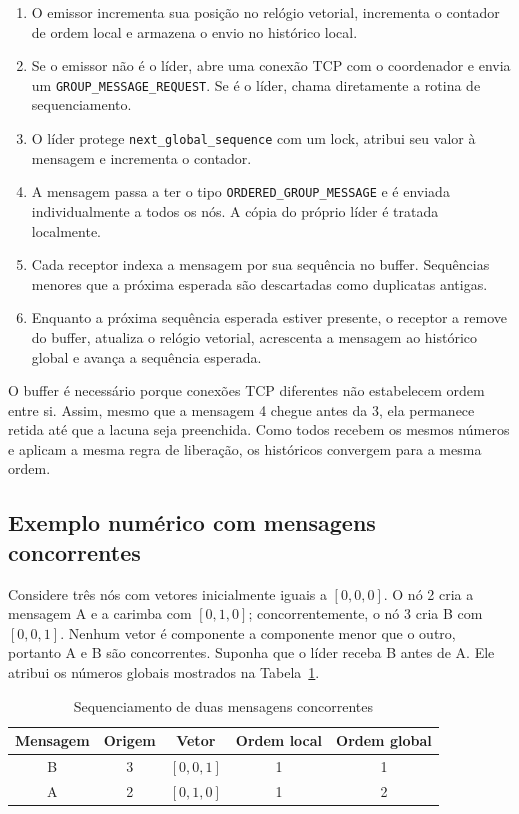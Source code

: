 \begin{enumerate}
    \item O emissor incrementa sua posição no relógio vetorial, incrementa o
    contador de ordem local e armazena o envio no histórico local.
    \item Se o emissor não é o líder, abre uma conexão TCP com o coordenador e
    envia um \texttt{GROUP\_MESSAGE\_REQUEST}. Se é o líder, chama diretamente a
    rotina de sequenciamento.
    \item O líder protege \texttt{next\_global\_sequence} com um lock, atribui seu
    valor à mensagem e incrementa o contador.
    \item A mensagem passa a ter o tipo \texttt{ORDERED\_GROUP\_MESSAGE} e é
    enviada individualmente a todos os nós. A cópia do próprio líder é tratada
    localmente.
    \item Cada receptor indexa a mensagem por sua sequência no buffer. Sequências
    menores que a próxima esperada são descartadas como duplicatas antigas.
    \item Enquanto a próxima sequência esperada estiver presente, o receptor a
    remove do buffer, atualiza o relógio vetorial, acrescenta a mensagem ao
    histórico global e avança a sequência esperada.
\end{enumerate}

O buffer é necessário porque conexões TCP diferentes não estabelecem ordem entre
si. Assim, mesmo que a mensagem 4 chegue antes da 3, ela permanece retida até que
a lacuna seja preenchida. Como todos recebem os mesmos números e aplicam a mesma
regra de liberação, os históricos convergem para a mesma ordem.

\subsection{Exemplo numérico com mensagens concorrentes}

Considere três nós com vetores inicialmente iguais a $[0,0,0]$. O nó 2 cria a
mensagem A e a carimba com $[0,1,0]$; concorrentemente, o nó 3 cria B com
$[0,0,1]$. Nenhum vetor é componente a componente menor que o outro, portanto A e
B são concorrentes. Suponha que o líder receba B antes de A. Ele atribui os números
globais mostrados na Tabela~\ref{tab:exemplo-ordem}.

\begin{table}[H]
    \centering
    \caption{Sequenciamento de duas mensagens concorrentes}
    \label{tab:exemplo-ordem}
    \begin{tabular}{ccccc}
        \toprule
        \textbf{Mensagem} & \textbf{Origem} & \textbf{Vetor} &
        \textbf{Ordem local} & \textbf{Ordem global} \\
        \midrule
        B & 3 & $[0,0,1]$ & 1 & 1 \\
        A & 2 & $[0,1,0]$ & 1 & 2 \\
        \bottomrule
    \end{tabular}
\end{table}

